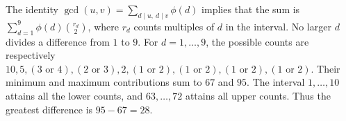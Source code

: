 The identity $\gcd(u,v)=\sum_{d\mid u,\ d\mid v}\phi(d)$ implies that the sum is $\sum_{d=1}^9\phi(d)\binom{r_d}{2}$, where $r_d$ counts multiples of $d$ in the interval. No larger $d$ divides a difference from $1$ to $9$. For $d=1,\ldots,9$, the possible counts are respectively $10,5,(3\text{ or }4),(2\text{ or }3),2,(1\text{ or }2),(1\text{ or }2),(1\text{ or }2),(1\text{ or }2)$. Their minimum and maximum contributions sum to $67$ and $95$. The interval $1,\ldots,10$ attains all the lower counts, and $63,\ldots,72$ attains all upper counts. Thus the greatest difference is $\boxed{95-67=28}$.
